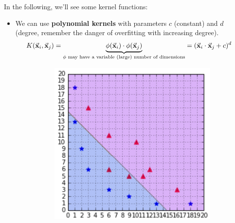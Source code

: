 In the following, we'll see some kernel functions:
\begin{itemize}
  \item We can use \textbf{polynomial kernels} with parameters $c$ (constant) and $d$ (degree, remember the danger of overfitting with increasing degree).
  \begin{align*}
    K(\vec{\mathbf{x}}_i, \vec{\mathbf{x}}_j) &= \underbrace{\phi(\vec{\mathbf{x}}_i) \cdot \phi(\vec{\mathbf{x}}_j)}_{\phi \textnormal{\color{black}{ may have a variable (large) number of dimensions}}} = (\vec{\mathbf{x}}_i\cdot\vec{\mathbf{x}}_j + c)^d
  \end{align*}
  \begin{figure}[ht]
    \centering
    \begin{subfigure}{0.2\textwidth}
      \centering
      \includegraphics[width=1\textwidth]{assets/svm/kernel__1.png}
    \end{subfigure}\vspace*{1mm}
    \begin{subfigure}{0.2\textwidth}
      \centering

\end{subfigure}
\end{figure}
\end{itemize}
